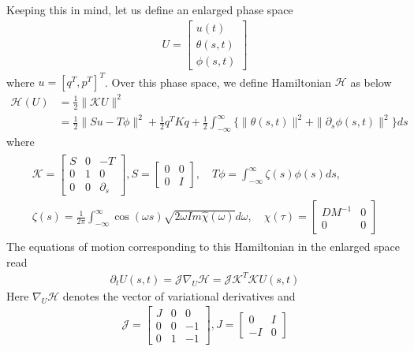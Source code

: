 \documentclass[12pt,a4paper,draft]{article}
\begin{document}
Keeping this in mind, let us define an enlarged phase space
\begin{align}
U = \begin{bmatrix}
u(t) \\ \theta(s,t) \\ \phi(s,t)
\end{bmatrix}
\end{align}
where $u = [q^T, p^T]^T$. Over this phase space, we define Hamiltonian $\mathcal{H}$ as below
\begin{align}
\mathcal{H}(U) &= \frac{1}{2} \|\mathcal{K} U\|^2 \\
&= \frac{1}{2} \|Su-T\phi\|^2 + \frac{1}{2} q^T K q + \frac{1}{2} \int_{-\infty}^{\infty} \{ \|\theta(s,t)\|^2 + \|\partial_s \phi(s,t)\|^2 \} ds
\end{align}
where
\begin{gather}
\begin{aligned}
\mathcal{K} = \begin{bmatrix}
S & 0 & -T \\
0 & 1 & 0 \\
0 & 0 & \partial_s
\end{bmatrix}, S = \begin{bmatrix}
0 & 0 \\ 0 & I
\end{bmatrix}, \quad
T\phi = \int_{-\infty}^{\infty} \zeta(s) \phi(s) ds,\\
\zeta(s) = \frac{1}{2\pi} \int_{-\infty}^{\infty} \cos(\omega s) \sqrt{2\omega Im \hat{\chi}(\omega)} d\omega, \quad \chi(\tau) = \begin{bmatrix}
DM^{-1} & 0 \\ 0 & 0
\end{bmatrix}
\end{aligned}
\end{gather}
The equations of motion corresponding to this Hamiltonian in the enlarged space read
\begin{align}
\partial_t U(s,t) = \mathcal{J} \nabla_U \mathcal{H} = \mathcal{J} \mathcal{K}^T \mathcal{K} U(s,t)
\end{align}
Here $\nabla_U \mathcal{H}$ denotes the vector of variational derivatives and
\begin{align}
\mathcal{J} = \begin{bmatrix}
J & 0 & 0 \\
0 & 0 & -1 \\
0 & 1 & -1
\end{bmatrix}, J = \begin{bmatrix}
0 & I \\
-I & 0
\end{bmatrix}
\end{align}
\end{document}
